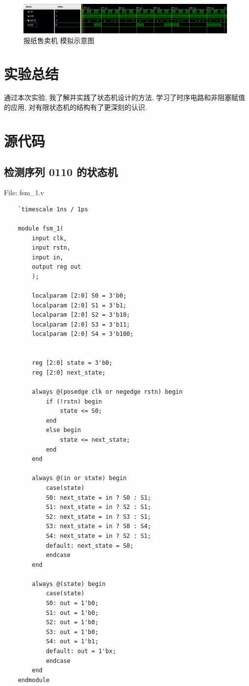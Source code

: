 \documentclass{article}
\begin{document}
\begin{figure}[H]
    \centering
    \includegraphics[width=0.98\textwidth]{assets/newspaper_seller.png}
    \caption{报纸售卖机 模拟示意图}
\end{figure}

\section{实验总结}

通过本次实验, 我了解并实践了状态机设计的方法, 学习了时序电路和非阻塞赋值的应用, 对有限状态机的结构有了更深刻的认识.

\section{源代码}

\subsection{检测序列 0110 的状态机}

File: fsm\_1.v
\begin{lstlisting}
    `timescale 1ns / 1ps

    module fsm_1(
        input clk,
        input rstn,
        input in,
        output reg out
        );
        
        localparam [2:0] S0 = 3'b0;
        localparam [2:0] S1 = 3'b1;
        localparam [2:0] S2 = 3'b10;
        localparam [2:0] S3 = 3'b11;
        localparam [2:0] S4 = 3'b100;
        
        
        reg [2:0] state = 3'b0;
        reg [2:0] next_state;
        
        always @(posedge clk or negedge rstn) begin
            if (!rstn) begin
                state <= S0;
            end
            else begin
                state <= next_state;
            end
        end
        
        always @(in or state) begin
            case(state)
            S0: next_state = in ? S0 : S1;
            S1: next_state = in ? S2 : S1;
            S2: next_state = in ? S3 : S1;
            S3: next_state = in ? S0 : S4;
            S4: next_state = in ? S2 : S1;
            default: next_state = S0;
            endcase
        end

        always @(state) begin
            case(state)
            S0: out = 1'b0;
            S1: out = 1'b0;
            S2: out = 1'b0;
            S3: out = 1'b0;
            S4: out = 1'b1;
            default: out = 1'bx;
            endcase
        end
    endmodule
\end{lstlisting}
\end{document}
